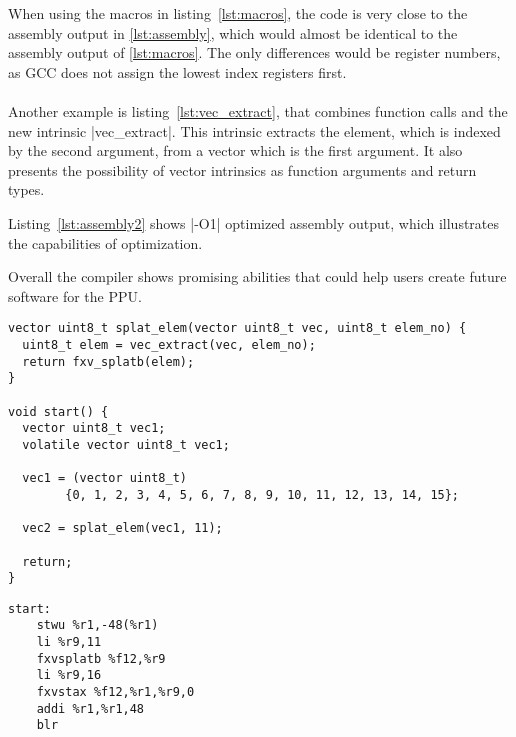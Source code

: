When using the macros in listing~\ref{lst:macros}, the code is very close to the assembly output in \ref{lst:assembly}, which would almost be identical to the assembly output of \ref{lst:macros}.
The only differences would be register numbers, as \ac{GCC} does not assign the lowest index registers first.
\\
\\
Another example is listing~\ref{lst:vec_extract}, that combines function calls and the new intrinsic |vec_extract|.
This intrinsic extracts the element, which is indexed by the second argument, from a vector which is the first argument.
It also presents the possibility of vector intrinsics as function arguments and return types.

Listing~\ref{lst:assembly2} shows |-O1| optimized assembly output, which illustrates the capabilities of optimization.

Overall the compiler shows promising abilities that could help users create future software for the \ac{PPU}.

\begin{adjustbox}{width=1.0\textwidth}
\lstset{numbers=none}
    \begin{minipage}[t]{.4\textwidth}
    \begin{lstlisting}[caption={Code Example with Function and Complex Intrinsic}, label=lst:vec_extract]
vector uint8_t splat_elem(vector uint8_t vec, uint8_t elem_no) {
  uint8_t elem = vec_extract(vec, elem_no);
  return fxv_splatb(elem);
}

void start() {
  vector uint8_t vec1;
  volatile vector uint8_t vec1;

  vec1 = (vector uint8_t)
        {0, 1, 2, 3, 4, 5, 6, 7, 8, 9, 10, 11, 12, 13, 14, 15};

  vec2 = splat_elem(vec1, 11);

  return;
} 
\end{lstlisting}
\end{minipage}
\hspace{1cm}
\begin{minipage}[t]{.4\textwidth}
    \begin{lstlisting}[caption={Assembly Output for \ref{lst:vec_extract}}, label=lst:assembly2]
start:
	stwu %r1,-48(%r1)
	li %r9,11
	fxvsplatb %f12,%r9
	li %r9,16
	fxvstax %f12,%r1,%r9,0
	addi %r1,%r1,48
	blr
\end{lstlisting}
\end{minipage}
\end{adjustbox}

